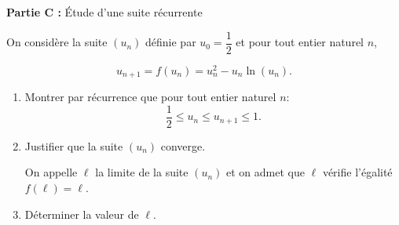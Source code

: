 \medskip

\textbf{Partie C :} Étude d'une suite récurrente

On considère la suite $\left(u_n\right)$ définie par $u_0 = \dfrac12$ et pour tout entier naturel $n$,

\[u_{n+1} = f\left(u_n\right) = u_n^2  - u_n \ln \left(u_n\right).\]

\medskip

\begin{enumerate}
\item Montrer par récurrence que pour tout entier naturel $n$:
\[\dfrac12  \leqslant u_n \leqslant u_{n+1} \leqslant 1.\]

\item Justifier que la suite $\left(u_n\right)$ converge.

On appelle $\ell$ la limite de la suite $\left(u_n\right)$ et on admet que $\ell$ vérifie l'égalité $f(\ell) = \ell$.
\item Déterminer la valeur de $\ell$.
\end{enumerate}

\bigskip
